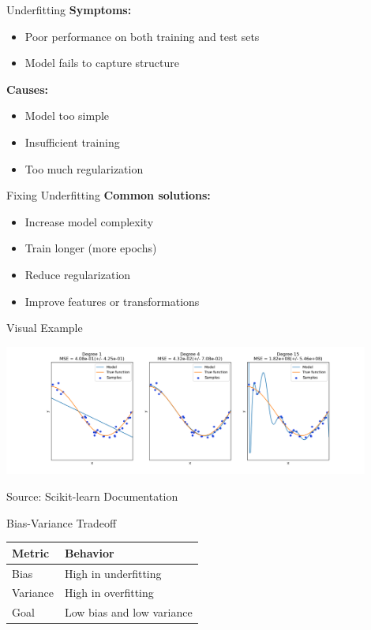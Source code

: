 \documentclass{beamer}
\begin{document}
\begin{frame}{Underfitting}
  \textbf{Symptoms:}
  \begin{itemize}
    \item Poor performance on both training and test sets
    \item Model fails to capture structure
  \end{itemize}
  \vspace{0.5em}
  \textbf{Causes:}
  \begin{itemize}
    \item Model too simple
    \item Insufficient training
    \item Too much regularization
  \end{itemize}
\end{frame}

\begin{frame}{Fixing Underfitting}
  \textbf{Common solutions:}
  \begin{itemize}
    \item Increase model complexity
    \item Train longer (more epochs)
    \item Reduce regularization
    \item Improve features or transformations
  \end{itemize}
\end{frame}

\begin{frame}{Visual Example}
  \begin{center}
    \includegraphics[width=0.9\textwidth]{sphx_glr_plot_underfitting_overfitting_001.png}
  \end{center}
  \footnotesize Source: Scikit-learn Documentation
\end{frame}

\begin{frame}{Bias-Variance Tradeoff}
  \begin{tabular}{@{}ll@{}}
    \toprule
    \textbf{Metric} & \textbf{Behavior} \\
    \midrule
    Bias     & High in underfitting \\
    Variance & High in overfitting \\
    Goal     & Low bias and low variance \\
    \bottomrule
  \end{tabular}
\end{frame}
\end{document}
